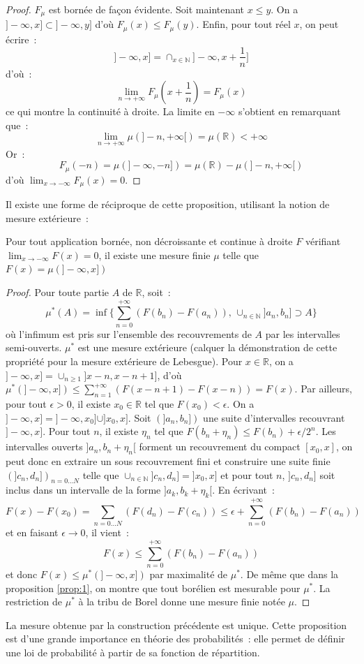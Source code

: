\begin{proof}
$F_\mu$ est bornée de façon évidente. Soit maintenant $x \leq y$. On a
$]-\infty, x] \subset ]-\infty, y]$ d'où $F_{\mu}(x) \leq
F_{\mu}(y)$. Enfin, pour tout réel $x$, on peut écrire~:
\[
]-\infty, x ] = \cap_{x \in \mathbb{N}} ]-\infty, x + \frac{1}{n}]
\]
d'où~:
\[
\lim_{n \to +\infty} F_\mu(x+\frac{1}{n}) = F_\mu(x)
\]
ce qui montre la continuité à droite.
La limite en $-\infty$ s'obtient en remarquant que~:
\[
\lim_{n \to +\infty} \mu(]-n, +\infty[) = \mu(\mathbb{R}) < +\infty
\]
Or~:
\[
F_\mu(-n) = \mu(]-\infty, -n]) = \mu(\mathbb{R}) -  \mu(]-n,
+\infty[)
\] 
d'où $\lim_{x \to -\infty}F_\mu(x) = 0$. 
\end{proof}
Il existe une forme de réciproque de cette proposition, utilisant la
notion de mesure extérieure~:
\begin{prop}
Pour tout application bornée, non décroissante et continue à droite
$F$ vérifiant $\lim_{x \to -\infty} F(x) = 0$,
il existe une mesure finie $\mu$ telle que $F(x) = \mu(]-\infty, x])$
\end{prop}
\begin{proof}
Pour toute partie $A$ de $\mathbb{R}$, soit~:
\[
\mu^*(A) = \inf \{ \sum_{n=0}^{+\infty} (F(b_n) - F(a_n)), \, \cup_{n \in
\mathbb{N}} ]a_n, b_n] \supset A \}
\]
où l'infimum est pris sur l'ensemble des recouvrements de $A$ par les
intervalles semi-ouverts. $\mu^*$ est une mesure extérieure (calquer la
démonstration de cette propriété pour la mesure extérieure de Lebesgue).
Pour $x  \in \mathbb{R}$, on a $]-\infty, x] = \cup_{n \geq 1}
]x-n, x -n +1]$, d'où $\mu^*(]-\infty,x]) \leq \sum_{n=1}^{+\infty}
(F(x-n+1)-F(x-n)) = F(x)$. 
Par ailleurs, pour tout $\epsilon > 0$, il existe $x_0 \in \mathbb{R}$
tel que $F(x_0) < \epsilon$. On a $]-\infty , x] = ]-\infty, x_0] \cup
]x_0,x]$. Soit $(]a_n, b_n])$ une suite d'intervalles recouvrant
$]-\infty, x]$. Pour tout $n$, il existe $\eta_n$ tel que
$F(b_n+\eta_n) \leq F(b_n) + \epsilon/{2^n}$. Les intervalles ouverts
$]a_n, b_n+\eta_n[$ forment un recouvrement du compact $[x_0,x]$, on
peut donc en extraire un sous recouvrement fini et construire une
suite finie $(]c_n, d_n])_{n=0\dots N}$ telle que $\cup_{n \in \mathbb{N}} ]c_n, d_n] =
]x_0, x]$ et pour tout $n$, $]c_n, d_n]$ soit inclus dans un intervalle
de la forme $]a_k, b_k+\eta_k[$. En écrivant~:
\[
F(x)-F(x_0) = \sum_{n=0 \dots N} (F(d_n)-F(c_n)) \leq \epsilon + \sum_{n=0}^{+\infty} (F(b_n)-F(a_n))
\]
et en faisant $\epsilon \to 0$, il vient~:
\[
F(x) \leq \sum_{n=0}^{+\infty} (F(b_n)-F(a_n))
\]
et donc $F(x) \leq \mu^*(]-\infty, x])$ par maximalité de $\mu^*$.
De même que dans la proposition \ref{prop:1}, on montre que tout borélien est
mesurable pour $\mu^*$. La restriction de $\mu^*$ à la tribu de Borel
donne une mesure finie notée $\mu$. 
\end{proof}
La mesure obtenue par la construction précédente est unique. Cette
proposition est d'une grande importance en théorie des probabilités~:
elle permet de définir une loi de probabilité à partir de sa fonction
de répartition.


